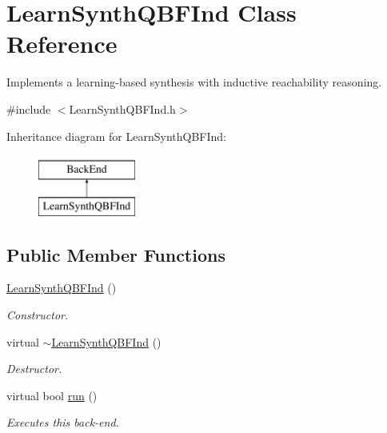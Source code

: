 \hypertarget{classLearnSynthQBFInd}{\section{Learn\-Synth\-Q\-B\-F\-Ind Class Reference}
\label{classLearnSynthQBFInd}
}


Implements a learning-\/based synthesis with inductive reachability reasoning.  




{\ttfamily \#include $<$Learn\-Synth\-Q\-B\-F\-Ind.\-h$>$}

Inheritance diagram for Learn\-Synth\-Q\-B\-F\-Ind\-:\begin{figure}[H]
\begin{center}
\leavevmode
\includegraphics[height=2.000000cm]{classLearnSynthQBFInd}
\end{center}
\end{figure}
\subsection*{Public Member Functions}
\begin{DoxyCompactItemize}
\item 
\hyperlink{classLearnSynthQBFInd_a840e4e87cae6e30bd2845e6d241f0f9c}{Learn\-Synth\-Q\-B\-F\-Ind} ()
\begin{DoxyCompactList}\small\item\em Constructor. \end{DoxyCompactList}\item 
virtual \hyperlink{classLearnSynthQBFInd_ae7c562c17f47985549499bb1ea6d4485}{$\sim$\-Learn\-Synth\-Q\-B\-F\-Ind} ()
\begin{DoxyCompactList}\small\item\em Destructor. \end{DoxyCompactList}\item 
virtual bool \hyperlink{classLearnSynthQBFInd_a6709343a109f82c427dcbc4a576d9c03}{run} ()
\begin{DoxyCompactList}\small\item\em Executes this back-\/end. \end{DoxyCompactList}\end{DoxyCompactItemize}
